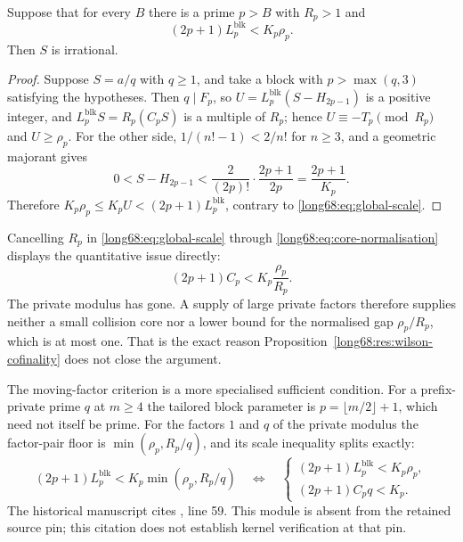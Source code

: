 \documentclass[11pt]{article}
\newcommand{\Ser}{S}
\newcommand{\Lc}{L}
\begin{document}
\begin{theorem}\label{long68:res:global-residue}
Suppose that for every $B$ there is a prime $p>B$ with $R_p>1$ and
\begin{equation}\label{long68:eq:global-scale}
 (2p+1)\Lc^{\mathrm{blk}}_p<K_p\rho_p .
\end{equation}
Then $\Ser$ is irrational.
\end{theorem}

\begin{proof}
Suppose $\Ser=a/q$ with $q\ge1$, and take a block with $p>\max(q,3)$
satisfying the hypotheses.  Then $q\mid F_p$, so
$U=\Lc^{\mathrm{blk}}_p(\Ser-H_{2p-1})$ is a positive integer, and
$\Lc^{\mathrm{blk}}_p\Ser=R_p(C_p\Ser)$ is a multiple of $R_p$; hence
$U\equiv-T_p\pmod{R_p}$ and $U\ge\rho_p$.  For the other side,
$1/(n!-1)<2/n!$ for $n\ge3$, and a geometric majorant gives
\[
 0<\Ser-H_{2p-1}<\frac{2}{(2p)!}\cdot\frac{2p+1}{2p}=\frac{2p+1}{K_p}.
\]
Therefore $K_p\rho_p\le K_pU<(2p+1)\Lc^{\mathrm{blk}}_p$, contrary to
\eqref{long68:eq:global-scale}.
\end{proof}

Cancelling $R_p$ in \eqref{long68:eq:global-scale} through
\eqref{long68:eq:core-normalisation} displays the quantitative issue directly:
\begin{equation}\label{long68:eq:core-gap-scale}
 (2p+1)C_p<K_p\frac{\rho_p}{R_p}.
\end{equation}
The private modulus has gone.  A supply of large private factors therefore
supplies neither a small collision core nor a lower bound for the normalised
gap $\rho_p/R_p$, which is at most one.  That is the exact reason
Proposition~\ref{long68:res:wilson-cofinality} does not close the argument.

\label{long68:res:lead-moving-factor-split}
\label{long68:res:moving-factor-scale-split}
The moving-factor criterion is a more specialised sufficient condition.  For
a prefix-private prime $q$ at $m\ge4$ the tailored block parameter is
$p=\lfloor m/2\rfloor+1$, which need not itself be prime.  For the factors
$1$ and $q$ of the private modulus the factor-pair floor is
$\min(\rho_p,R_p/q)$, and its scale inequality splits exactly:
\begin{equation}\label{long68:eq:factor-split}
 (2p+1)\Lc^{\mathrm{blk}}_p<K_p\min(\rho_p,R_p/q)
 \quad\Longleftrightarrow\quad
 \begin{cases}
 (2p+1)\Lc^{\mathrm{blk}}_p<K_p\rho_p,\\
 (2p+1)C_pq<K_p .
 \end{cases}
\end{equation}
  The historical manuscript cites , line 59. This module is absent from the retained source pin; this citation does not establish kernel verification at that pin.
\end{document}
